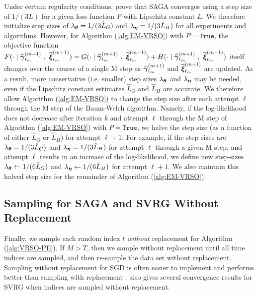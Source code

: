 Under certain regularity conditions, \citet{Defazio:2014} prove that SAGA converges using a step size of $1/(3L)$ for a given loss function $F$ with Lipschitz constant $L$. We therefore initialize step sizes of $\lambda_{\boldsymbol{\theta}} = 1/(3 \hat L_G)$ and $\lambda_{\boldsymbol{\eta}} = 1/(3 \hat L_H)$ for all experiments and algorithms. However, for Algorithm (\ref{alg:EM-VRSO}) with $P = \texttt{True}$, the objective function $F(\cdot \mid \widehat {\boldsymbol{\gamma}}_{t_m}^{(m+1)} ~,~ \widehat {\boldsymbol{\xi}}_{t_m}^{(m+1)}) = G(\cdot \mid \widehat {\boldsymbol{\gamma}}_{t_m}^{(m+1)} ~,~ \widehat {\boldsymbol{\xi}}_{t_m}^{(m+1)}) + H(\cdot \mid \widehat {\boldsymbol{\gamma}}_{t_m}^{(m+1)} ~,~ \widehat {\boldsymbol{\xi}}_{t_m}^{(m+1)})$ itself changes over the course of a single M step as $\widehat {\boldsymbol{\gamma}}_{t_m}^{(m+1)}$ and $\widehat {\boldsymbol{\xi}}_{t_m}^{(m+1)}$ are updated. As a result, more conservative (i.e. smaller) step sizes $\lambda_{\boldsymbol{\theta}}$ and $\lambda_{\boldsymbol{\eta}}$ may be needed, even if the Lipschitz constant estimates $\hat L_G$ and $\hat L_H$ are accurate. We therefore allow Algorithm (\ref{alg:EM-VRSO}) to change the step size after each attempt $\ell$ through the M step of the Baum-Welch algorithm. Namely, if the log-likelihood does not decrease after iteration $k$ and attempt $\ell$ through the M step of Algorithm (\ref{alg:EM-VRSO}) with $P = \texttt{True}$, we halve the step size (as a function of either $\hat L_G$ or $\hat L_H$) for attempt $\ell+1$. For example, if the step sizes are $\lambda_{\boldsymbol{\theta}} = 1/(3 \hat L_G)$ and $\lambda_{\boldsymbol{\eta}} = 1/(3 \hat L_H)$ for attempt $\ell$ through a given M step, and attempt $\ell$ results in an increase of the log-likelihood, we define new step-sizes $\lambda_{\boldsymbol{\theta}} \leftarrow 1/(6 \hat L_G)$ and $\lambda_{\boldsymbol{\eta}} \leftarrow 1/(6 \hat L_H)$ for attempt $\ell+1$. We also maintain this halved step size for the remainder of Algorithm (\ref{alg:EM-VRSO}).

\subsection{Sampling for SAGA and SVRG Without Replacement}
\label{subsec:wo_replacement}

Finally, we sample each random index $t$ \textit{without} replacement for Algorithm (\ref{alg:VRSO-PE}). If $M > T$, then we sample without replacement until all time indices are sampled, and then re-sample the data set without replacement. Sampling without replacement for SGD is often easier to implement and performs better than sampling with replacement \citep{Gurbuzbalaban:2015}. \citet{Ohad:2016} also gives several convergence results for SVRG when indices are sampled without replacement.